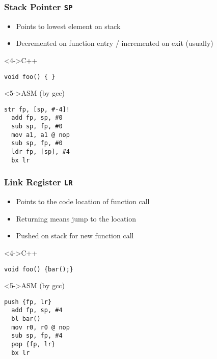 \documentclass{beamer}
\begin{document}
\begin{frame}[fragile]
\frametitle{Stack Pointer \lstinline{SP}}
\begin{itemize}
\item<1-> Points to lowest element on stack
\item<2-> Decremented on function entry / incremented on exit (usually)
\end{itemize}

\begin{block}<4->{C++}
\begin{lstlisting}
void foo() { }
\end{lstlisting}
\end{block}

\begin{block}<5->{ASM (by gcc)}
\begin{lstlisting}[language=ASM]
  str fp, [sp, #-4]!
  add fp, sp, #0
  sub sp, fp, #0
  mov a1, a1 @ nop
  sub sp, fp, #0
  ldr fp, [sp], #4
  bx lr
\end{lstlisting}
\end{block}

\end{frame}

\begin{frame}[fragile]
\frametitle{Link Register \lstinline{LR}}
\begin{itemize}
\item<1-> Points to the code location of function call
\item<2-> Returning means jump to the location
\item<3-> Pushed on stack for new function call
\end{itemize}

\begin{block}<4->{C++}
\begin{lstlisting}
void foo() {bar();}
\end{lstlisting}
\end{block}

\begin{block}<5->{ASM (by gcc)}
\begin{lstlisting}[language=ASM]
  push {fp, lr}
  add fp, sp, #4
  bl bar()
  mov r0, r0 @ nop
  sub sp, fp, #4
  pop {fp, lr}
  bx lr
\end{lstlisting}
\end{block}

\end{frame}
\end{document}
